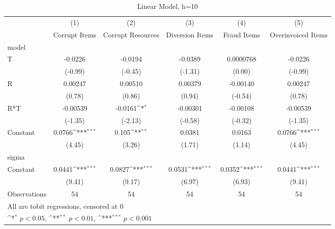 \documentclass{beamer}
\def\sym#1{\ifmmode^{#1}\else\(^{#1}\)\fi}
\begin{document}
\begin{frame}[shrink=30]
\begin{table}
\caption{Linear Model, h=10}
\begin{tabular}{l*{5}{c}}
    \toprule
    & \multicolumn{1}{c}{(1)} & \multicolumn{1}{c}{(2)} & \multicolumn{1}{c}{(3)} & \multicolumn{1}{c}{(4)} & \multicolumn{1}{c}{(5)}\\
    & \multicolumn{1}{c}{Corrupt Items} & \multicolumn{1}{c}{Corrupt Resources} & \multicolumn{1}{c}{Diversion Items} & \multicolumn{1}{c}{Fraud Items} & \multicolumn{1}{c}{Overinvoiced Items}\\
    \midrule
    model & & & & & \\
    T & -0.0226 & -0.0194 & -0.0389 & 0.0000768 & -0.0226 \\
    & (-0.99) & (-0.45) & (-1.31) & (0.00) & (-0.99) \\[1em]
    R & 0.00247 & 0.00510 & 0.00379 & -0.00140 & 0.00247 \\
    & (0.78) & (0.86) & (0.94) & (-0.54) & (0.78) \\[1em]
    R*T & -0.00539 & -0.0161\sym{*} & -0.00301 & -0.00108 & -0.00539 \\
    & (-1.35) & (-2.13) & (-0.58) & (-0.32) & (-1.35) \\[1em]
    Constant & 0.0766\sym{***} & 0.105\sym{**} & 0.0381 & 0.0163 & 0.0766\sym{***}\\
    & (4.45) & (3.26) & (1.71) & (1.14) & (4.45) \\
    \midrule
    sigma & & & & & \\
    Constant & 0.0441\sym{***} & 0.0827\sym{***} & 0.0531\sym{***} & 0.0352\sym{***} & 0.0441\sym{***}\\
    & (9.41) & (9.17) & (6.97) & (6.93) & (9.41) \\
    \midrule
    Observations&54 &54 &54 &54 &54 \\
    \bottomrule
    \multicolumn{6}{l}{\footnotesize All are tobit regressions, censored at 0}\\
    \multicolumn{6}{l}{\footnotesize \sym{*} \(p<0.05\), \sym{**} \(p<0.01\), \sym{***} \(p<0.001\)}\\
\end{tabular}
\end{table}
\end{frame}
\end{document}
